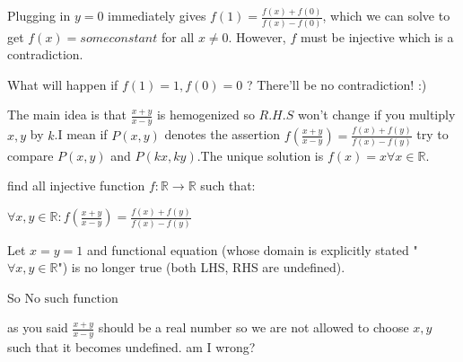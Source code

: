 \begin{solution}
	\begin{tcolorbox}Plugging in $y=0$ immediately gives $f(1)=\frac{f(x)+f(0)}{f(x)-f(0)}$, which we can solve to get $f(x)=someconstant$ for all $x \neq 0$. However, $f$ must be injective which is a contradiction.\end{tcolorbox}

What will happen if $f(1)=1, f(0)=0$ ? There'll be no contradiction! :)
\end{solution}



\begin{solution}
	The main idea is that $\frac{x+y}{x-y}$ is hemogenized so $R.H.S$ won't change if you multiply $x,y$ by $k$.I mean if $P(x,y)$ denotes the assertion $f(\frac{x+y}{x-y})=\frac{f(x)+f(y)}{f(x)-f(y)}$ try to compare $P(x,y)$ and $P(kx,ky)$.The unique solution is $f(x)=x \forall x \in \mathbb{R}$.
\end{solution}



\begin{solution}
	\begin{tcolorbox}find all injective function $f : \mathbb R \to \mathbb R $ such that:

 $\forall x,y \in \mathbb R :f(\frac{x+y}{x-y})=\frac{f(x)+f(y)}{f(x)-f(y)}$\end{tcolorbox}

Let $x=y=1$ and functional equation (whose domain is explicitly stated "$\forall x,y\in\mathbb R$") is no longer true (both LHS, RHS are undefined).

So $\boxed{\text{No such function}}$

\end{solution}



\begin{solution}
	as you said $\frac{x+y}{x-y}$ should be a real number so we are not allowed to choose $x,y$ such that it becomes undefined. am I wrong?
\end{solution}



